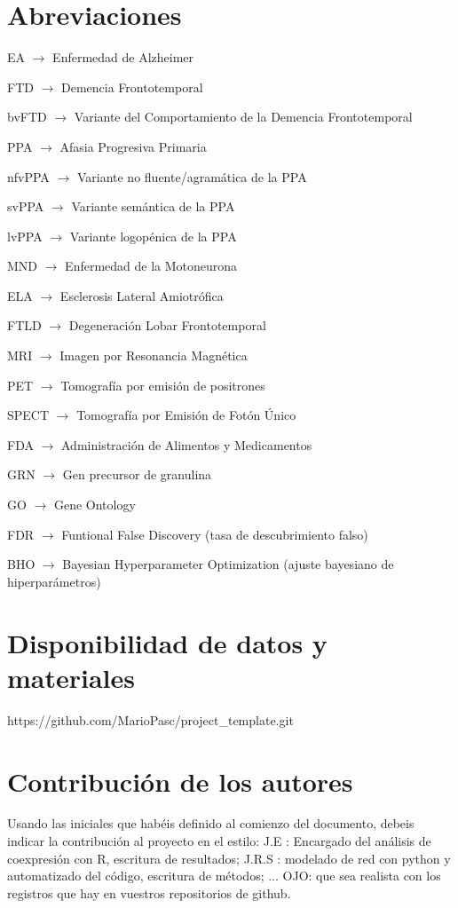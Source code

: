 \documentclass{bmcart}
\begin{document}
	\begin{backmatter}
	
		\section*{Abreviaciones}%
			EA $\rightarrow$ Enfermedad de Alzheimer
		
			FTD $\rightarrow$ Demencia Frontotemporal
			
			bvFTD $\rightarrow$ Variante del Comportamiento de la Demencia Frontotemporal
			
			PPA $\rightarrow$ Afasia Progresiva Primaria
			
			nfvPPA $\rightarrow$ Variante no fluente/agramática de la PPA
			
			svPPA $\rightarrow$ Variante semántica de la PPA
			
			lvPPA $\rightarrow$ Variante logopénica de la PPA
			
			MND $\rightarrow$ Enfermedad de la Motoneurona
			
			ELA $\rightarrow$ Esclerosis Lateral Amiotrófica
			
			FTLD $\rightarrow$ Degeneración Lobar Frontotemporal
			
			MRI $\rightarrow$ Imagen por Resonancia Magnética
			
			PET $\rightarrow$ Tomografía por emisión de positrones
			
			SPECT $\rightarrow$ Tomografía por Emisión de Fotón Único
			
			FDA $\rightarrow$ Administración de Alimentos y Medicamentos
			
			GRN $\rightarrow$ Gen precursor de granulina
			
			GO $\rightarrow$ Gene Ontology
			
			FDR $\rightarrow$ Funtional False Discovery (tasa de descubrimiento falso)
			
			BHO $\rightarrow$ Bayesian Hyperparameter Optimization (ajuste bayesiano de hiperparámetros)	
		
		\section*{Disponibilidad de datos y materiales}%
			https://github.com/MarioPasc/project\_template.git
		
		\section*{Contribución de los autores}
			Usando las iniciales que habéis definido al comienzo del documento, debeis indicar la contribución al proyecto en el estilo:
			J.E : Encargado del análisis de coexpresión con R, escritura de resultados; J.R.S : modelado de red con python y automatizado del código, escritura de métodos; ...
			OJO: que sea realista con los registros que hay en vuestros repositorios de github. 
		

\end{backmatter}
\end{document}
